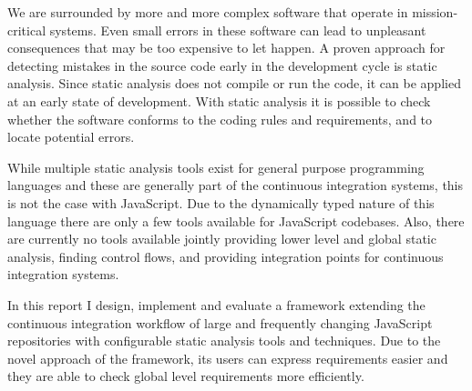We are surrounded by more and more complex software that operate in mission-critical systems. Even small errors in these software can lead to unpleasant consequences that may be too expensive to let happen. A proven approach for detecting mistakes in the source code early in the development cycle is static analysis. Since static analysis does not compile or run the code, it can be applied at an early state of development. With static analysis it is possible to check whether the software conforms to the coding rules and requirements, and to locate potential errors.

While multiple static analysis tools exist for general purpose programming languages and these are generally part of the continuous integration systems, this is not the case with JavaScript. Due to the dynamically typed nature of this language there are only a few tools available for JavaScript codebases. Also, there are currently no tools available jointly providing lower level and global static analysis, finding control flows, and providing integration points for continuous integration systems.

In this report I design, implement and evaluate a framework extending the continuous integration workflow of large and frequently changing JavaScript repositories with configurable static analysis tools and techniques. Due to the novel approach of the framework, its users can express requirements easier and they are able to check global level requirements more efficiently.

\clearpage
